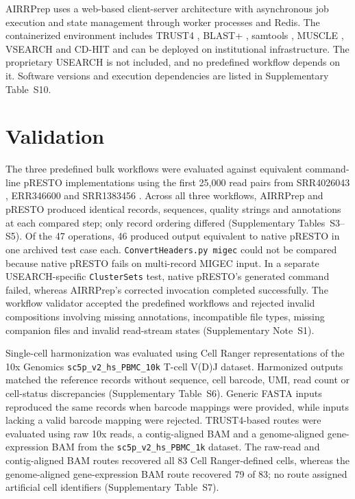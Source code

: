 \documentclass[unnumsec,webpdf,contemporary,large]{oup-authoring-template}
\begin{document}
AIRRPrep uses a web-based client-server architecture with asynchronous job execution and state management through worker processes and Redis. The containerized environment includes TRUST4 \citep{song2021}, BLAST+ \citep{camacho2009}, samtools \citep{danecek2021}, MUSCLE \citep{edgar2004}, VSEARCH \citep{rognes2016} and CD-HIT \citep{fu2012} and can be deployed on institutional infrastructure. The proprietary USEARCH is not included, and no predefined workflow depends on it. Software versions and execution dependencies are listed in Supplementary Table~S10.

\section{Validation}

The three predefined bulk workflows were evaluated against equivalent
command-line pRESTO implementations using the first 25,000 read pairs
from SRR4026043 \citep{vanderheiden2017}, ERR346600
\citep{greiff2014} and SRR1383456 \citep{stern2014}. Across all three
workflows, AIRRPrep and pRESTO produced identical records, sequences,
quality strings and annotations at each compared step; only record
ordering differed (Supplementary Tables~S3--S5). Of the 47 operations,
46 produced output equivalent to native pRESTO in one archived test
case each. \texttt{ConvertHeaders.py migec} could not be compared
because native pRESTO fails on multi-record MIGEC input. In a separate
USEARCH-specific \texttt{ClusterSets} test, native pRESTO's generated
command failed, whereas AIRRPrep's corrected invocation completed
successfully. The workflow validator accepted the predefined workflows
and rejected invalid compositions involving missing annotations,
incompatible file types, missing companion files and invalid read-stream
states (Supplementary Note~S1).

Single-cell harmonization was evaluated using Cell Ranger
representations of the 10x Genomics
\texttt{sc5p\_v2\_hs\_PBMC\_10k} T-cell V(D)J dataset. Harmonized
outputs matched the reference records without sequence, cell barcode,
UMI, read count or cell-status discrepancies (Supplementary
Table~S6). Generic FASTA inputs reproduced the same records when
barcode mappings were provided, while inputs lacking a valid barcode
mapping were rejected. TRUST4-based routes were evaluated using raw
10x reads, a contig-aligned BAM and a genome-aligned gene-expression
BAM from the \texttt{sc5p\_v2\_hs\_PBMC\_1k} dataset. The raw-read
and contig-aligned BAM routes recovered all 83 Cell Ranger-defined
cells, whereas the genome-aligned gene-expression BAM route recovered
79 of 83; no route assigned artificial cell identifiers (Supplementary
Table~S7).
\end{document}
